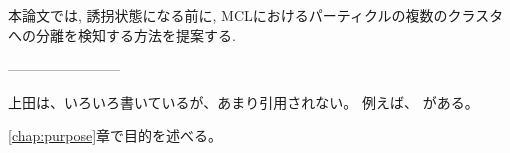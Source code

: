 本論文では, 誘拐状態になる前に, MCLにおけるパーティクルの複数のクラスタへの分離を検知する方法を提案する. 










------------------------


上田は、いろいろ書いているが、あまり引用されない。
例えば、\cite{上田2015gihyo,ueda2015,上田2015jsai}
がある。

\ref{chap:purpose}章で目的を述べる。

%
